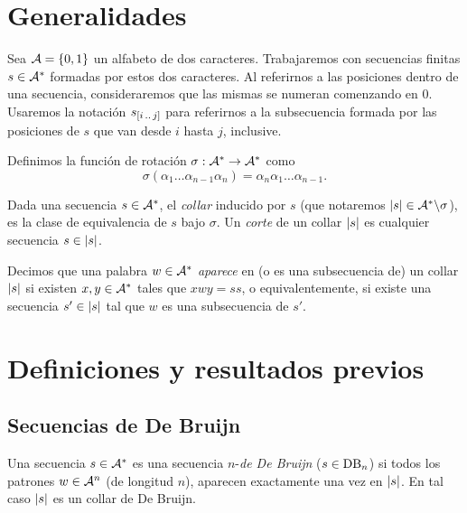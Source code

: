 \section{Generalidades}

Sea $\mathcal{A} = \lbrace0, 1\rbrace$ un alfabeto de dos caracteres.
Trabajaremos con secuencias finitas $s \in \mathcal{A}^*$ formadas por estos dos
caracteres. Al referirnos a las posiciones dentro de una secuencia,
consideraremos que las mismas se numeran comenzando en $0$. Usaremos la
notación $s_{[i\,..\,j]}$ para referirnos a la subsecuencia formada por las
posiciones de $s$ que van desde $i$ hasta $j$, inclusive.

\begin{defi}
  Definimos la función de rotación $\sigma: \mathcal{A}^* \to \mathcal{A}^*$ como
  \[ \sigma(\alpha_1\dots\alpha_{n-1}\alpha_n) =
    \alpha_n\alpha_1\dots\alpha_{n-1}. \]
\end{defi}

\begin{defi}
  Dada una secuencia $s \in \mathcal{A}^*$, el \emph{collar} inducido por $s$
  (que notaremos $\left\vert s\right\vert \in \mathcal{A}^*\backslash\sigma$), es la clase de
  equivalencia de $s$ bajo $\sigma$. Un \emph{corte} de un collar $\left\vert s\right\vert$
  es cualquier secuencia $s \in \left\vert s\right\vert$.
\end{defi}

\begin{defi}

  Decimos que una palabra $w \in \mathcal{A}^*$ \emph{aparece} en (o es una
  subsecuencia de) un collar $\left\vert s\right\vert$ si existen $x, y \in \mathcal{A}^*$ tales
  que $xwy = ss$, o equivalentemente, si existe una secuencia $s' \in \left\vert s\right\vert$
  tal que $w$ es una subsecuencia de $s'$.
\end{defi}

\section{Definiciones y resultados previos}

\subsection{Secuencias de De Bruijn}

\begin{defi}
  Una secuencia $s \in \mathcal{A}^*$ es una secuencia $n$-\emph{de De Bruijn}
  ($s \in \text{DB}_{n}$) si todos los patrones $w \in \mathcal{A}^n$ (de longitud $n$),
  aparecen exactamente una vez en $\left\vert s\right\vert$. En tal caso $\left\vert s\right\vert$ es un
  collar de De Bruijn.
\end{defi}

